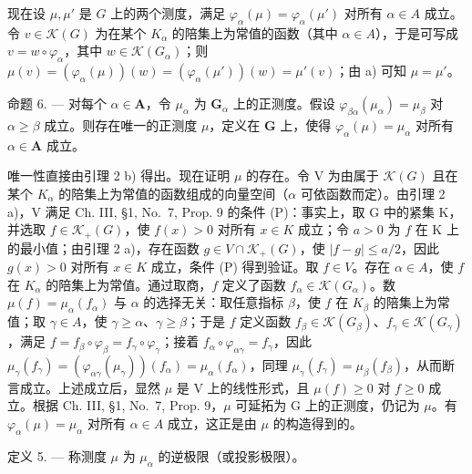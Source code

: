 现在设 \(\mu, \mu'\) 是 \(G\) 上的两个测度，满足 \(\varphi_{\alpha}(\mu) = \varphi_{\alpha}(\mu')\) 对所有 \(\alpha \in A\) 成立。令 \(v \in \mathcal{K}(G)\) 为在某个 \(K_{\alpha}\) 的陪集上为常值的函数（其中 \(\alpha \in A\)），于是可写成 \(v = w \circ \varphi_{\alpha}\)，其中 \(w \in \mathcal{K}(G_{\alpha})\)；则 \(\mu(v) = (\varphi_{\alpha}(\mu))(w) = (\varphi_{\alpha}(\mu'))(w) = \mu'(v)\)；由 a) 可知 \(\mu = \mu'\)。

命题 6. --- 对每个 \(\alpha \in \mathbf{A}\)，令 \(\mu_{\alpha}\) 为 \(\mathbf{G}_{\alpha}\) 上的正测度。假设 \(\varphi_{\beta \alpha}(\mu_{\alpha}) = \mu_{\beta}\) 对 \(\alpha \geqslant \beta\) 成立。则存在唯一的正测度 \(\mu\)，定义在 \(\mathbf{G}\) 上，使得 \(\varphi_{\alpha}(\mu) = \mu_{\alpha}\) 对所有 \(\alpha \in \mathbf{A}\) 成立。

唯一性直接由引理 2 b) 得出。现在证明 \(\mu\) 的存在。令 V 为由属于 \(\mathcal{K}(G)\) 且在某个 \(K_{\alpha}\) 的陪集上为常值的函数组成的向量空间（\(\alpha\) 可依函数而定）。由引理 2 a)，V 满足 Ch. III, §1, No.~7, Prop. 9 的条件 (P)：事实上，取 G 中的紧集 K，并选取 \(f \in \mathcal{K}_{+}(G)\)，使 \(f(x) > 0\) 对所有 \(x \in K\) 成立；令 \(a > 0\) 为 \(f\) 在 K 上的最小值；由引理 2 a)，存在函数 \(g \in V \cap \mathcal{K}_{+}(G)\)，使 \(|f - g| \leqslant a/2\)，因此 \(g(x) > 0\) 对所有 \(x \in K\) 成立，条件 (P) 得到验证。取 \(f \in V\)。存在 \(\alpha \in A\)，使 \(f\) 在 \(K_{\alpha}\) 的陪集上为常值。通过取商，\(f\) 定义了函数 \(f_{\alpha} \in \mathcal{K}(G_{\alpha})\)。数 \(\mu(f) = \mu_{\alpha}(f_{\alpha})\) 与 \(\alpha\) 的选择无关：取任意指标 \(\beta\)，使 \(f\) 在 \(K_{\beta}\) 的陪集上为常值；取 \(\gamma \in A\)，使 \(\gamma \geqslant \alpha\)、\(\gamma \geqslant \beta\)；于是 \(f\) 定义函数 \(f_{\beta} \in \mathcal{K}(G_{\beta})\)、\(f_{\gamma} \in \mathcal{K}(G_{\gamma})\)，满足 \(f = f_{\beta} \circ \varphi_{\beta} = f_{\gamma} \circ \varphi_{\gamma}\)；接着 \(f_{\alpha} \circ \varphi_{\alpha\gamma} = f_{\gamma}\)，因此 \(\mu_{\gamma}(f_{\gamma}) = (\varphi_{\alpha\gamma}(\mu_{\gamma}))(f_{\alpha}) = \mu_{\alpha}(f_{\alpha})\)，同理 \(\mu_{\gamma}(f_{\gamma}) = \mu_{\beta}(f_{\beta})\)，从而断言成立。上述成立后，显然 \(\mu\) 是 V 上的线性形式，且 \(\mu(f) \geqslant 0\) 对 \(f \geqslant 0\) 成立。根据 Ch. III, §1, No.~7, Prop. 9，\(\mu\) 可延拓为 G 上的正测度，仍记为 \(\mu\)。有 \(\varphi_{\alpha}(\mu) = \mu_{\alpha}\) 对所有 \(\alpha \in A\) 成立，这正是由 \(\mu\) 的构造得到的。

定义 5. --- 称测度 \(\mu\) 为 \(\mu_{\alpha}\) 的逆极限（或投影极限）。


